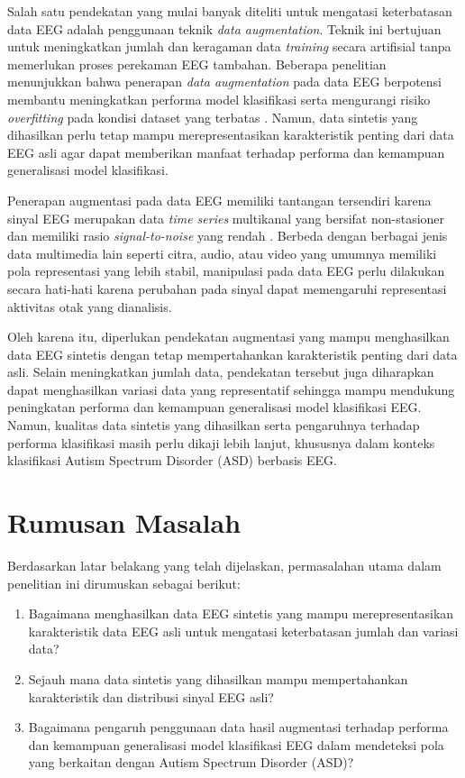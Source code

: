 Salah satu pendekatan yang mulai banyak diteliti untuk mengatasi keterbatasan data EEG adalah penggunaan teknik \textit{data augmentation}. Teknik ini bertujuan untuk meningkatkan jumlah dan keragaman data \textit{training} secara artifisial tanpa memerlukan proses perekaman EEG tambahan. Beberapa penelitian menunjukkan bahwa penerapan \textit{data augmentation} pada data EEG berpotensi membantu meningkatkan performa model klasifikasi serta mengurangi risiko \textit{overfitting} pada kondisi dataset yang terbatas \cite{eeg_augmentation_review}. Namun, data sintetis yang dihasilkan perlu tetap mampu merepresentasikan karakteristik penting dari data EEG asli agar dapat memberikan manfaat terhadap performa dan kemampuan generalisasi model klasifikasi.

Penerapan augmentasi pada data EEG memiliki tantangan tersendiri karena sinyal EEG merupakan data \textit{time series} multikanal yang bersifat non-stasioner dan memiliki rasio \textit{signal-to-noise} yang rendah \cite{eeg_feature_review}. Berbeda dengan berbagai jenis data multimedia lain seperti citra, audio, atau video yang umumnya memiliki pola representasi yang lebih stabil, manipulasi pada data EEG perlu dilakukan secara hati-hati karena perubahan pada sinyal dapat memengaruhi representasi aktivitas otak yang dianalisis. 

Oleh karena itu, diperlukan pendekatan augmentasi yang mampu menghasilkan data EEG sintetis dengan tetap mempertahankan karakteristik penting dari data asli. Selain meningkatkan jumlah data, pendekatan tersebut juga diharapkan dapat menghasilkan variasi data yang representatif sehingga mampu mendukung peningkatan performa dan kemampuan generalisasi model klasifikasi EEG. Namun, kualitas data sintetis yang dihasilkan serta pengaruhnya terhadap performa klasifikasi masih perlu dikaji lebih lanjut, khususnya dalam konteks klasifikasi Autism Spectrum Disorder (ASD) berbasis EEG.

\section{Rumusan Masalah}
\label{sec:rumusan_masalah}
Berdasarkan latar belakang yang telah dijelaskan, permasalahan utama dalam penelitian
ini dirumuskan sebagai berikut:
\begin{enumerate}
    \item Bagaimana menghasilkan data EEG sintetis yang mampu merepresentasikan karakteristik data EEG asli untuk mengatasi keterbatasan jumlah dan variasi data?

    \item Sejauh mana data sintetis yang dihasilkan mampu mempertahankan karakteristik dan distribusi sinyal EEG asli?
    
    \item Bagaimana pengaruh penggunaan data hasil augmentasi terhadap performa dan kemampuan generalisasi model klasifikasi EEG dalam mendeteksi pola yang berkaitan dengan Autism Spectrum Disorder (ASD)?
\end{enumerate}


